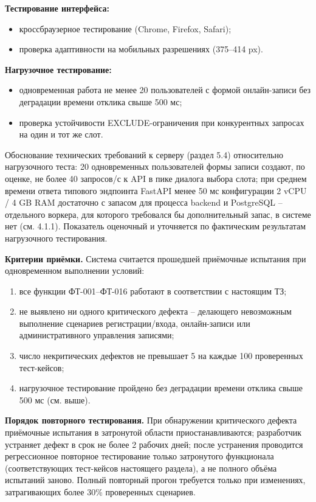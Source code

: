 \textbf{Тестирование интерфейса:}
\begin{itemize}
  \item кроссбраузерное тестирование (Chrome, Firefox, Safari);
  \item проверка адаптивности на мобильных разрешениях (375--414 px).
\end{itemize}

\textbf{Нагрузочное тестирование:}
\begin{itemize}
  \item одновременная работа не менее 20 пользователей с формой онлайн-записи без деградации времени отклика свыше 500 мс;
  \item проверка устойчивости EXCLUDE-ограничения при конкурентных запросах на один и тот же слот.
\end{itemize}

Обоснование технических требований к серверу (раздел 5.4) относительно нагрузочного теста: 20 одновременных пользователей формы записи создают, по оценке, не более 40 запросов/с к API в пике диалога выбора слота; при среднем времени ответа типового эндпоинта FastAPI менее 50 мс конфигурации 2 vCPU / 4 GB RAM достаточно с запасом для процесса backend и PostgreSQL -- отдельного воркера, для которого требовался бы дополнительный запас, в системе нет (см. 4.1.1). Показатель оценочный и уточняется по фактическим результатам нагрузочного тестирования.

\textbf{Критерии приёмки.} Система считается прошедшей приёмочные испытания при одновременном выполнении условий:
\begin{enumerate}
  \item все функции ФТ-001--ФТ-016 работают в соответствии с настоящим ТЗ;
  \item не выявлено ни одного критического дефекта -- делающего невозможным выполнение сценариев регистрации/входа, онлайн-записи или административного управления записями;
  \item число некритических дефектов не превышает 5 на каждые 100 проверенных тест-кейсов;
  \item нагрузочное тестирование пройдено без деградации времени отклика свыше 500 мс (см. выше).
\end{enumerate}

\textbf{Порядок повторного тестирования.} При обнаружении критического дефекта приёмочные испытания в затронутой области приостанавливаются; разработчик устраняет дефект в срок не более 2 рабочих дней; после устранения проводится регрессионное повторное тестирование только затронутого функционала (соответствующих тест-кейсов настоящего раздела), а не полного объёма испытаний заново. Полный повторный прогон требуется только при изменениях, затрагивающих более 30\% проверенных сценариев.


